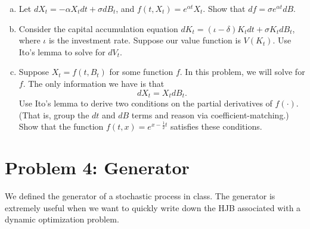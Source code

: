 \documentclass[11pt]{extarticle}
\theoremstyle{plain}
\theoremstyle{definition}
\begin{document}
\begin{enumerate}[(a)]
\item Let $dX_t = - \alpha X_t dt + \sigma dB_t$, and $f(t, X_t) = e^{\alpha t} X_t$. Show that $df = \sigma e^{\alpha t} d B$. 

\item Consider the capital accumulation equation $dK_t = (\iota - \delta) K_t dt + \sigma K_t dB_t$, where $\iota$ is the investment rate. Suppose our value function is $V(K_t)$. Use Ito's lemma to solve for $dV_t$.   

\item Suppose $X_t = f(t, B_t)$ for some function $f$. In this problem, we will solve for $f$. The only information we have is that 
\begin{equation*}
	dX_t = X_t dB_t.
\end{equation*}
Use Ito's lemma to derive two conditions on the partial derivatives of $f(\cdot)$. (That is, group the $dt$ and $dB$ terms and reason via coefficient-matching.) Show that the function $f(t, x) = e^{x - \frac{1}{2}t}$ satisfies these conditions. 
\end{enumerate}




\vspace{5mm}
\section*{Problem 4: Generator}

We defined the generator of a stochastic process in class. The generator is extremely useful when we want to quickly write down the HJB associated with a dynamic optimization problem. 
\end{document}
